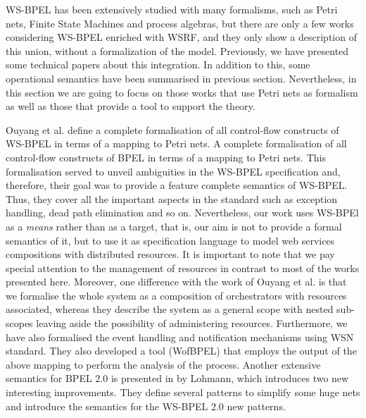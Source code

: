WS-BPEL has been extensively studied with many formalisms, such as
Petri nets, Finite State Machines and process algebras, but 
there are only a few works considering WS-BPEL enriched with 
WSRF, and they only show a description of this union, 
without a formalization of the model. Previously, we have presented some technical papers about this integration.
In addition to this, some operational semantics have been summarised in previous section. Nevertheless, 
in this section we are going to focus on those works that use Petri nets as formalism as well as those that provide
a tool to support the theory.

Ouyang et al. \cite{Ouyang:2007} define a complete formalisation of all control-flow constructs of WS-BPEL in terms of a mapping to Petri nets.
A complete formalisation of all control-flow constructs of BPEL in terms of a mapping to Petri nets.
This formalisation served to unveil ambiguities in the WS-BPEL specification and, therefore, their goal was to provide a feature complete semantics of WS-BPEL.
Thus, they cover all the important aspects in the standard such as exception handling, dead path elimination and so on. Nevertheless, our work uses WS-BPEl as a \emph{means} rather than as a target, that is, our aim is not to provide a formal semantics of it, but to use it as specification language to model web services compositions with distributed resources. It is important to note that we pay special attention to the management of resources in contrast to most of the works presented here. Moreover, one difference with the work of Ouyang et al. is that we formalise the whole
system as a composition of orchestrators with resources associated, whereas they describe the system as a general scope with nested sub-scopes leaving aside the possibility of administering resources. Furthermore, we have also formalised the event handling and notification mechanisms using WSN standard. 
They also developed a tool (WofBPEL) that employs the output of the above mapping to perform  the analysis of the process.  
Another extensive semantics for BPEL 2.0
is presented in \cite{Dumas:2008} by Lohmann, which introduces two new interesting improvements. They define several patterns to simplify some huge nets and introduce the semantics for the WS-BPEL 2.0 new patterns.

